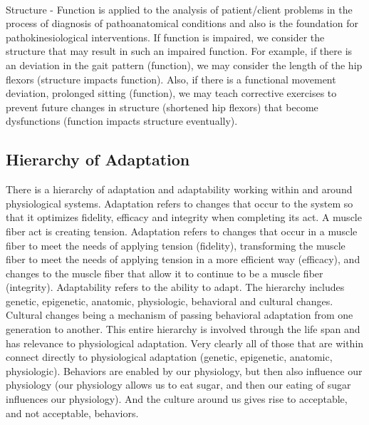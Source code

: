 \paragraph{}
Structure - Function is applied to the analysis of patient/client problems in the process of diagnosis of pathoanatomical conditions and also is the foundation for pathokinesiological interventions. If function is impaired, we consider the structure that may result in such an impaired function. For example, if there is an deviation in the gait pattern (function), we may consider the length of the hip flexors (structure impacts function). Also, if there is a functional movement deviation, prolonged sitting (function), we may teach corrective exercises to prevent future changes in structure (shortened hip flexors) that become dysfunctions (function impacts structure eventually).

\subsection{Hierarchy of Adaptation}

There is a hierarchy of adaptation and adaptability working within and around physiological systems. Adaptation refers to changes that occur to the system so that it optimizes fidelity, efficacy and integrity when completing its act. A muscle fiber act is creating tension. Adaptation refers to changes that occur in a muscle fiber to meet the needs of applying tension (fidelity), transforming the muscle fiber to meet the needs of applying tension in a more efficient way (efficacy), and changes to the muscle fiber that allow it to continue to be a muscle fiber (integrity). Adaptability refers to the ability to adapt. The hierarchy includes genetic, epigenetic, anatomic, physiologic, behavioral and cultural changes. Cultural changes being a mechanism of passing behavioral adaptation from one generation to another. This entire hierarchy is involved through the life span and has relevance to physiological adaptation. Very clearly all of those that are within connect directly to physiological adaptation (genetic, epigenetic, anatomic, physiologic). Behaviors are enabled by our physiology, but then also influence our physiology (our physiology allows us to eat sugar, and then our eating of sugar influences our physiology). And the culture around us gives rise to acceptable, and not acceptable, behaviors. 

